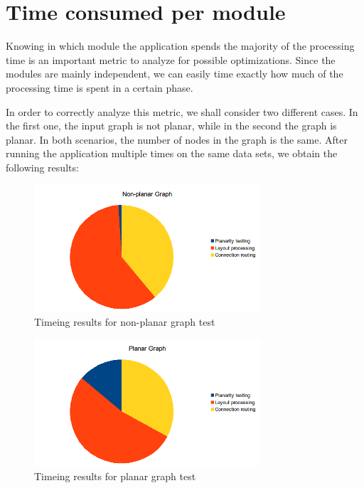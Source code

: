 \section{Time consumed per module}

Knowing in which module the application spends the majority of the processing time is an important metric 
to analyze for possible optimizations. Since the modules are mainly independent, we can easily time exactly 
how much of the processing time is spent in a certain phase. 

In order to correctly analyze this metric, we shall consider two different cases. In the first one, the input 
graph is not planar, while in the second the graph is planar. In both scenarios, the number of nodes in the 
graph is the same. After running the application multiple times on the same data sets, we obtain the 
following results: 

\begin{figure}[ht] \centering
\includegraphics[width=0.75\textwidth]{img/results/nonplanartime.png}
\caption{Timeing results for non-planar graph test} \end{figure}


\begin{figure}[ht] \centering
\includegraphics[width=0.75\textwidth]{img/results/planartime.png}
\caption{Timeing results for planar graph test} \end{figure}

